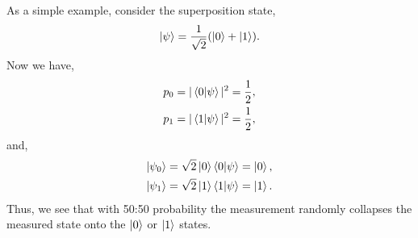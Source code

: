 \documentclass[aps,pra,twocolumn,amsmath,amssymb,nofootinbib,superscriptaddress]{revtex4}
\begin{document}
As a simple example, consider the superposition state,
\begin{align}
\ket\psi = \frac{1}{\sqrt{2}}(\ket{0}+\ket{1}).	
\end{align}
Now we have,
\begin{align}
p_0 = |\braket{0|\psi}|^2 = \frac{1}{2},\nonumber\\
p_1 = |\braket{1|\psi}|^2 = \frac{1}{2},
\end{align}
and,
\begin{align}
\ket{\psi_0} &= \sqrt{2}\ket{0}\braket{0|\psi} = \ket{0},\nonumber\\
\ket{\psi_1} &= \sqrt{2}\ket{1}\braket{1|\psi} = \ket{1}.
\end{align}
Thus, we see that with 50:50 probability the measurement randomly collapses the measured state onto the $\ket{0}$ or $\ket{1}$ states.
\end{document}
